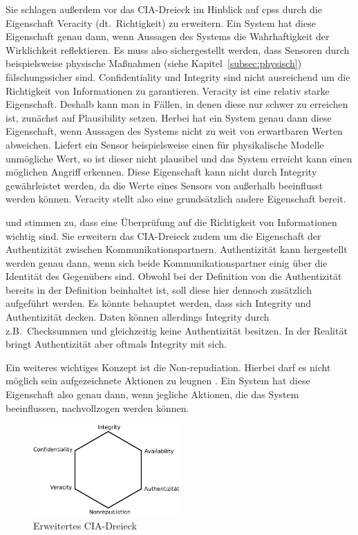 \documentclass[final,bibliography=totocnumbered]{include/sikseminar}
\newcommand{\cps}{\glspl{cps}\xspace}
\begin{document}
Sie schlagen außerdem vor das CIA-Dreieck im Hinblick auf \cps durch die Eigenschaft Veracity (dt.~Richtigkeit) zu erweitern.
Ein System hat diese Eigenschaft genau dann, wenn Aussagen des Systems die Wahrhaftigkeit der  Wirklichkeit reflektieren.
Es muss also sichergestellt werden, dass Sensoren durch beispielsweise physische Maßnahmen (siehe Kapitel~\ref{subsec:physisch}) fälschungssicher sind.
Confidentiality und Integrity sind nicht ausreichend um die Richtigkeit von Informationen zu garantieren.
Veracity ist eine relativ starke Eigenschaft.
Deshalb kann man in Fällen, in denen diese nur schwer zu erreichen ist, zunächst auf Plausibility setzen.
Herbei hat ein System genau dann diese Eigenschaft, wenn Aussagen des Systems nicht zu weit von erwartbaren Werten abweichen.
Liefert ein Sensor beispielsweise einen für physikalische Modelle unmögliche Wert, so ist dieser nicht plausibel und das System erreicht kann einen möglichen Angriff erkennen. \cite{GK16}
Diese Eigenschaft kann nicht durch Integrity gewährleistet werden, da die Werte eines Sensors von außerhalb beeinflusst werden können.
Veracity stellt also eine grundsätzlich andere Eigenschaft bereit.

\citeauthor{WYX+10} und \citeauthor{SFJ2017} stimmen zu, dass eine Überprüfung auf die Richtigkeit von Informationen wichtig sind.
Sie erweitern das CIA-Dreieck zudem um die Eigenschaft der Authentizität zwischen Kommunikationspartnern.
Authentizität kann hergestellt werden genau dann, wenn sich beide Kommunikationspartner einig über die Identität des Gegenübers sind.\label{def:authenticity}
Obwohl bei der Definition von \citeauthor{Cherdantseva2013} die Authentizität bereits in der Definition beinhaltet ist, soll diese hier dennoch zusätzlich aufgeführt werden.
Es könnte behauptet werden, dass sich Integrity und Authentizität decken.
Daten können allerdings Integrity durch z.B.\ Checksummen und gleichzeitig keine Authentizität besitzen.
In der Realität bringt Authentizität aber oftmals Integrity mit sich.

Ein weiteres wichtiges Konzept ist die Non-repudiation.
Hierbei darf es nicht möglich sein aufgezeichnete Aktionen zu leugnen \cite{NIST2013}.
Ein System hat diese Eigenschaft also genau dann, wenn jegliche Aktionen, die das System beeinflussen, nachvollzogen werden können. \label{def:nonrepudiation}

\begin{figure}
    \centering
    \includegraphics[width=0.5\textwidth]{triad}
    \caption{Erweitertes CIA-Dreieck}
    \label{fig:triad}
\end{figure}
\end{document}
